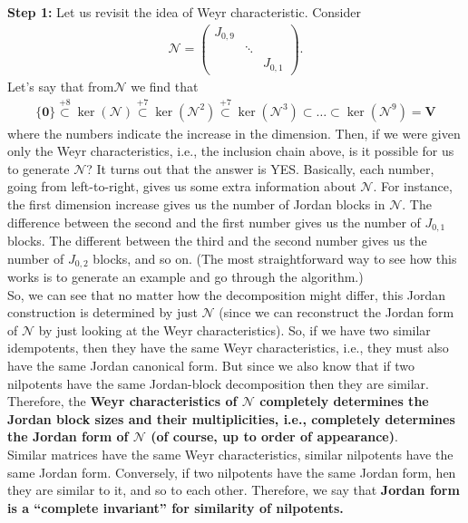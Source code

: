 \documentclass{book}
\theoremstyle{definition}
\newcommand{\V}{\mathbf{V}}
\begin{document}
\textbf{Step 1:} Let us revisit the idea of Weyr characteristic. Consider 
\begin{align*}
\mathcal{N} = \begin{pmatrix}
J_{0,9} & & \\
& \ddots & \\
& & J_{0,1}
\end{pmatrix}.
\end{align*}
Let's say that from$\mathcal{N}$ we find that
\begin{align*}
\{ \mathbf{0} \} \stackrel{+8}{\subset} \ker(\mathcal{N}) \stackrel{+7}{\subset} \ker(\mathcal{N}^2) \stackrel{+7}{\subset} \ker(\mathcal{N}^3) \subset \dots \subset \ker(\mathcal{N}^9) = \V
\end{align*}
where the numbers indicate the increase in the dimension. Then, if we were given only the Weyr characteristics, i.e., the inclusion chain above, is it possible for us to generate $\mathcal{N}$? It turns out that the answer is YES. Basically, each number, going from left-to-right, gives us some extra information about $\mathcal{N}$. For instance, the first dimension increase gives us the number of Jordan blocks in $\mathcal{N}$. The difference between the second and the first number gives us the number of $J_{0,1}$ blocks. The different between the third and the second number gives us the number of $J_{0,2}$ blocks, and so on. (The most straightforward way to see how this works is to generate an example and go through the algorithm.)\\

So, we can see that no matter how the decomposition might differ, this Jordan construction is determined by just $\mathcal{N}$ (since we can reconstruct the Jordan form of $\mathcal{N}$ by just looking at the Weyr characteristics). So, if we have two similar idempotents, then they have the same Weyr characteristics, i.e., they must also have the same Jordan canonical form. But since we also know that if two nilpotents have the same Jordan-block decomposition then they are similar. Therefore, the \textbf{Weyr characteristics of $\mathcal{N}$ completely determines the Jordan block sizes and their multiplicities, i.e., completely determines the Jordan form of $\mathcal{N}$ (of course, up to order of appearance)}. \\

Similar matrices have the same Weyr characteristics, similar nilpotents have the same Jordan form. Conversely, if two nilpotents have the same Jordan form, hen they are similar to it, and so to each other. Therefore, we say that \textbf{Jordan form is a ``complete invariant'' for similarity of nilpotents.}\\
\end{document}
